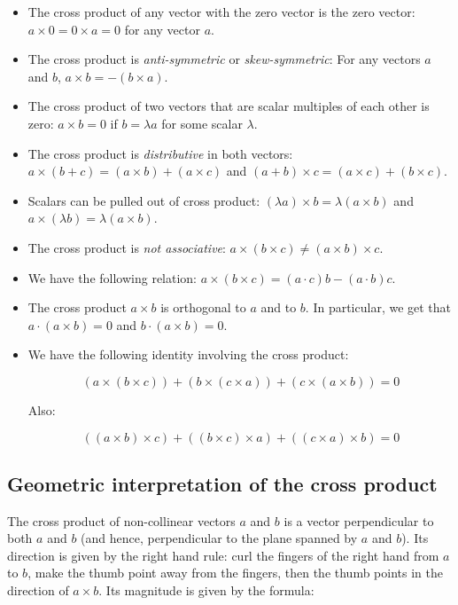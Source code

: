 \documentclass[10pt]{amsart}
\begin{document}
\begin{itemize}
\item The cross product of any vector with the zero vector is the zero
  vector: $a \times 0 = 0 \times a = 0$ for any vector $a$.
\item The cross product is {\em anti-symmetric} or {\em
  skew-symmetric}: For any vectors $a$ and $b$, $a \times b = -(b
  \times a)$. 
\item The cross product of two vectors that are scalar multiples of
  each other is zero: $a \times b = 0$ if $b = \lambda a$ for some
  scalar $\lambda$.
\item The cross product is {\em distributive} in both vectors: $a
  \times (b + c) = (a \times b) + (a \times c)$ and $(a + b) \times c
  = (a \times c) + (b \times c)$.
\item Scalars can be pulled out of cross product: $(\lambda a) \times
  b = \lambda(a \times b)$ and $a \times (\lambda b) = \lambda(a
  \times b)$.
\item The cross product is {\em not associative}: $a \times (b \times
  c) \ne (a \times b) \times c$.
\item We have the following relation: $a \times (b \times c) = (a
  \cdot c)b - (a \cdot b)c$.
\item The cross product $a \times b$ is orthogonal to $a$ and to
  $b$. In particular, we get that $a \cdot (a \times b) = 0$ and $b
  \cdot (a \times b) = 0$.
\item We have the following identity involving the cross product:

  $$(a \times (b \times c)) + (b \times (c \times a)) + (c \times (a \times b)) = 0$$

  Also:

  $$((a \times b) \times c) + ((b \times c) \times a) + ((c \times a) \times b) = 0$$
\end{itemize}

\subsection{Geometric interpretation of the cross product}

The cross product of non-collinear vectors $a$ and $b$ is a vector
perpendicular to both $a$ and $b$ (and hence, perpendicular to the
plane spanned by $a$ and $b$). Its direction is given by the right
hand rule: curl the fingers of the right hand from $a$ to $b$, make
the thumb point away from the fingers, then the thumb points in the
direction of $a \times b$. Its magnitude is given by the formula:
\end{document}
